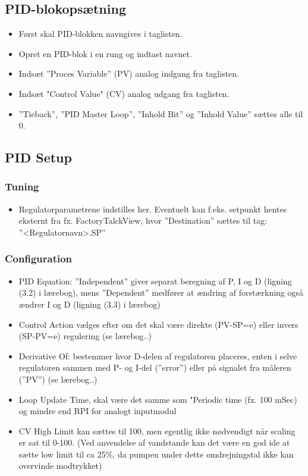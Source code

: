 \documentclass[12pt,a4paper]{article}
\begin{document}
	\subsection*{PID-blokopsætning}
	\begin{itemize}
		\item Først skal PID-blokken navngives i taglisten.
		\item Opret en PID-blok i en rung og indtast navnet.
		\item Indsæt ”Proces Variable” (PV) analog indgang fra taglisten.
		\item Indsæt "Control Value" (CV) analog udgang fra taglisten.
		\item ”Tieback”, ”PID Master Loop”, ”Inhold Bit” og ”Inhold Value” sættes alle til 0.
	\end{itemize}
	
	\subsection*{PID Setup}
	\subsubsection*{Tuning}
	\begin{itemize}
		\item Regulatorparametrene indstilles her. Eventuelt kan f.eks. setpunkt hentes eksternt fra fx. FactoryTalckView, hvor ”Destination” sættes til tag: ”<Regulatornavn>.SP”
	\end{itemize}
	
	\subsubsection*{Configuration}
	\begin{itemize}
		\item PID Equation: ”Independent” giver separat beregning af P, I og D (ligning (3.2) i lærebog), mens ”Dependent” medfører at ændring af forstærkning også ændrer I og D (ligning (3.3) i lærebog)
		\item Control Action vælges efter om det skal være direkte (PV-SP=e) eller invers (SP-PV=e) regulering (se lærebog..)
		\item Derivative Of: bestemmer hvor D-delen af regulatoren placeres, enten i selve regulatoren sammen med P- og I-del (”error”) eller på signalet fra måleren (”PV”) (se lærebog..)
		\item Loop Update Time, skal være det samme som "Periodic time (fx. 100 mSec) og mindre end RPI for analogt inputmodul
		\item CV High Limit kan sættes til 100, men egentlig ikke nødvendigt når scaling er sat til 0-100. (Ved anvendelse af vandstande kan det være en god ide at sætte low limit til ca 25\%, da pumpen under dette omdrejningstal ikke kan overvinde modtrykket)
	\end{itemize}
	
\end{document}
